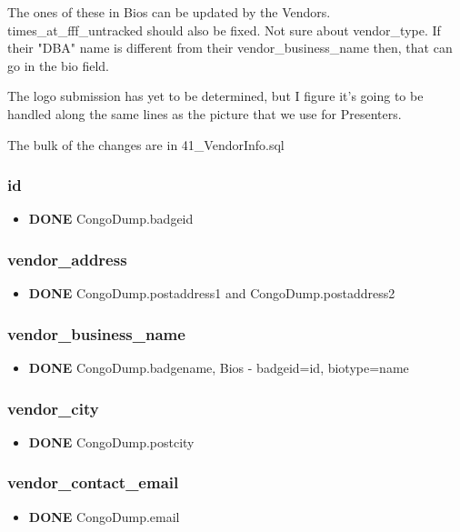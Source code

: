 \documentclass[captions=tablesignature]{scrartcl}
\begin{document}
The ones of these in Bios can be updated by the
Vendors. times\_at\_fff\_untracked should also be fixed.  Not sure
about vendor\_type.  If their "DBA" name is different from their
vendor\_business\_name then, that can go in the bio field.

The logo submission has yet to be determined, but I figure it's
going to be handled along the same lines as the picture that we
use for Presenters.

The bulk of the changes are in 41\_VendorInfo.sql
\subsubsection{id}
\label{sec-2-1-1}
\begin{itemize}
\item {\bfseries\sffamily DONE} CongoDump.badgeid
\label{sec-2-1-1-1}
\end{itemize}

\subsubsection{vendor\_address}
\label{sec-2-1-2}
\begin{itemize}
\item {\bfseries\sffamily DONE} CongoDump.postaddress1 and CongoDump.postaddress2
\label{sec-2-1-2-1}
\end{itemize}

\subsubsection{vendor\_business\_name}
\label{sec-2-1-3}
\begin{itemize}
\item {\bfseries\sffamily DONE} CongoDump.badgename, Bios - badgeid=id, biotype=name
\label{sec-2-1-3-1}
\end{itemize}

\subsubsection{vendor\_city}
\label{sec-2-1-4}
\begin{itemize}
\item {\bfseries\sffamily DONE} CongoDump.postcity
\label{sec-2-1-4-1}
\end{itemize}

\subsubsection{vendor\_contact\_email}
\label{sec-2-1-5}
\begin{itemize}
\item {\bfseries\sffamily DONE} CongoDump.email
\label{sec-2-1-5-1}
\end{itemize}
\end{document}
